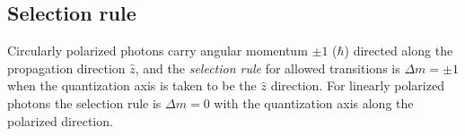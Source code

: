 \subsection{Selection rule}
Circularly polarized photons carry angular momentum $\pm 1$ ($\hbar$) directed along the propagation direction $\hat{z}$, and the \emph{selection rule} for allowed transitions is $\Delta m = \pm 1$ when the quantization axis is taken to be the $\hat{z}$ direction. For linearly polarized photons the selection rule is $\Delta m = 0$ with the quantization axis along the polarized direction.
